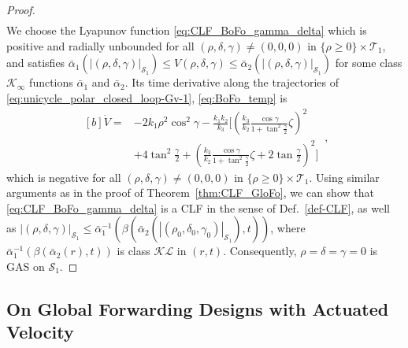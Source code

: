 \documentclass[letterpaper, 10 pt, conference]{ieeeconf}  %
\newcommand{\abs}[1]{\left\lvert#1\right\rvert}
\begin{document}
\begin{proof}
\begin{subequations}
\begin{eqnarray}
\end{eqnarray}
\end{subequations}
We choose the Lyapunov function \eqref{eq:CLF_BoFo_gamma_delta} which is positive and radially unbounded for all $(\rho,\delta,\gamma) \ne (0,0,0)$ in $\{\rho \ge 0\} \times \mathcal{T}_1$, and satisfies $ \bar\alpha_1(|(\rho,\delta, \gamma)|_{\mathcal{S}_1}) \le V(\rho,\delta,\gamma) \le \bar\alpha_2(|(\rho,\delta, \gamma)|_{\mathcal{S}_1})$ for some class $\mathcal{K}_{\infty}$ functions $\bar{\alpha}_{1}$ and $\bar{\alpha}_{2}$.
Its time derivative along the trajectories of \eqref{eq:unicycle_polar_closed_loop-Gv-1}, \eqref{eq:BoFo_temp} is
\begin{equation}
\begin{aligned}[b]
\dot V  = &-2k_1 \rho^2 \cos^2 \gamma- \frac{k_1k_2}{k_3}\Biggl[
\left(\frac{k_3}{k_2}\frac{\cos\gamma}{{1+\tan^2\frac{\gamma}{2}}} \zeta\right)^2\\
&+4\tan^2\frac{\gamma}{2}
+ \left(\frac{k_3}{k_2}\frac{\cos\gamma}{{1+\tan^2\frac{\gamma}{2}}}\zeta +2\tan\frac{\gamma}{2} \right)^2
\Biggr]\label{eq:V_dot_forward2}
\end{aligned}\,,
\end{equation}
which is negative for all $(\rho,\delta,\gamma) \ne (0,0,0)$ in $\{\rho \ge 0\} \times \mathcal{T}_1$.
Using similar arguments as in the proof of Theorem~\ref{thm:CLF_GloFo}, we can show that \eqref{eq:CLF_BoFo_gamma_delta} is a CLF in the sense of Def.~\ref{def-CLF}, as well as 
$\abs{(\rho,\delta,\gamma)}_{\mathcal{S}_1} \le \bar{\alpha}_1^{-1}(\beta( \bar{\alpha}_2(\abs{(\rho_0, \delta_0,\gamma_0)}_{\mathcal{S}_1}),t))$, 
where $\bar{\alpha}_1^{-1}(\beta( \bar{\alpha}_2(r),t))$ is class $\mathcal{KL}$ in $(r,t)$.
Consequently, %
$\rho =  \delta = \gamma = 0$ is GAS on $\mathcal{S}_1$.
\end{proof}

\subsection{On Global Forwarding Designs with Actuated Velocity}
\end{document}
